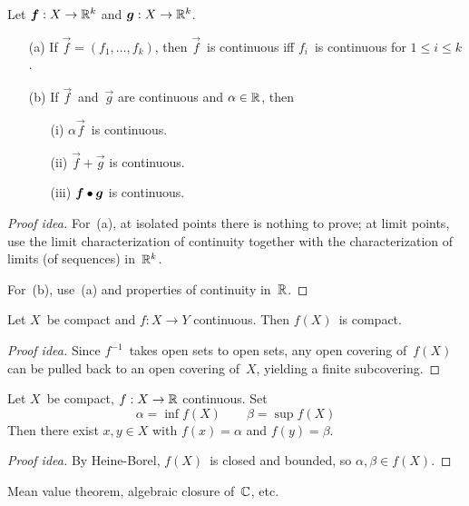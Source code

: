 \begin{thm}[Continuity in~\(\R^k\)]
Let \(\boldsymbol{f}:X\to\mathbb{R}^k\) and \(\boldsymbol{g}:X\to\mathbb{R}^k\).
\begin{enumerate}[itemsep=0pt]
\item[(a)] If \(\vec{f}=(f_1,\ldots,f_k)\), then \(\vec{f}\)~is continuous iff \(f_i\)~is continuous for \(1\le i\le k\).
\item[(b)] If \(\vec{f}\)~and~\(\vec{g}\) are continuous and \(\alpha\in\mathbb{R}\), then
\begin{enumerate}[itemsep=0pt]
\item[(i)] \(\alpha\vec{f}\)~is continuous.
\item[(ii)] \(\vec{f}+\vec{g}\) is continuous.
\item[(iii)] \(\boldsymbol{f}\bullet\boldsymbol{g}\) is continuous.
\end{enumerate}
\end{enumerate}
\end{thm}
\begin{proof}[Proof idea]
For~(a), at isolated points there is nothing to prove; at limit points, use the limit characterization of continuity together with the characterization of limits (of sequences) in~\(\R^k\).

For~(b), use~(a) and properties of continuity in~\(\mathbb{R}\).
\end{proof}

\begin{thm}
Let \(X\)~be compact and \(f:X\to Y\) continuous. Then \(f(X)\)~is compact.
\end{thm}
\begin{proof}[Proof idea]
Since \(f^{-1}\)~takes open sets to open sets, any open covering of~\(f(X)\) can be pulled back to an open covering of~\(X\), yielding a finite subcovering.
\end{proof}

\begin{cor}
Let \(X\)~be compact, \(f:X\to\mathbb{R}\) continuous. Set
\[\alpha=\inf f(X)\qquad\beta=\sup f(X)\]
Then there exist \(x,y\in X\) with \(f(x)=\alpha\) and \(f(y)=\beta\).
\end{cor}
\begin{proof}[Proof idea]
By Heine-Borel, \(f(X)\)~is closed and bounded, so \(\alpha,\beta\in f(X)\).
\end{proof}
\begin{app}
Mean value theorem, algebraic closure of~\(\mathbb{C}\), etc.
\end{app}

